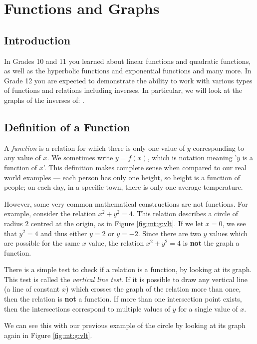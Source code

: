 \chapter{Functions and Graphs}
\label{m:fg12}

\section{Introduction}
\label{m:fg12:i}
In Grades 10 and 11 you learned about linear functions and quadratic
functions, as well as the hyperbolic functions and exponential
functions and many more.  In Grade 12 you are expected to demonstrate
the ability to work with various types of functions and relations
including inverses. In particular, we will look at the graphs of
the inverses of:
.

\section{Definition of a Function}
A \textit{function} is a relation for which there is only one value of $y$ corresponding to any value of $x$. We sometimes write $y=f(x)$, which is notation meaning '$y$ is a function of $x$'. This definition makes complete sense when compared to our real world examples --- each person has only one height, so height is a function of people; on each day, in a specific town, there is only one average temperature.

However, some very common  mathematical constructions are not functions. For example, consider the relation $x^2+y^2=4$. This relation describes a circle of radius $2$ centred at the origin, as in Figure \ref{fig:mt:g:vlt}. If we let $x=0$, we see that $y^2=4$ and thus either $y=2$ or $y=-2$. Since there are two $y$ values which are possible for the same $x$ value, the relation $x^2+y^2=4$ is \textbf{not} the graph a function.

There is a simple test to check if a relation is a function, by looking at its graph. This test is called the \textit{vertical line test}. If it is possible to draw any vertical line (a line of constant $x$) which crosses the graph of the relation more than once, then the relation is \textbf{not} a function. If more than one intersection point exists, then the intersections correspond to multiple values of $y$ for a single value of $x$.

We can see this with our previous example of the circle by looking at its graph again in Figure \ref{fig:mt:g:vlt}.

